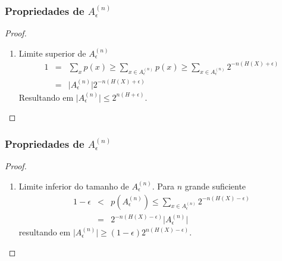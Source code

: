 \begin{frame}%
  \frametitle{Propriedades de $A_\epsilon^{(n)}$}
  \begin{proof}
  \begin{enumerate}[3]
  \item Limite superior de $A_\epsilon^{(n)}$
        \begin{eqnarray}
        1 &=& \sum_x p(x) \geq \sum_{x \in A_\epsilon^{(n)}} p(x) \geq \sum_{x \in A_\epsilon^{(n)}} 2^{-n(H(X)+\epsilon)} \nonumber \\
        &=& \vert A_\epsilon^{(n)} \vert 2^{-n(H(X)+\epsilon)}
        \end{eqnarray}
        Resultando em $\vert A_\epsilon^{(n)} \vert \leq 2^{n(H+\epsilon)}$.
  \end{enumerate}
  \end{proof}
\end{frame}


\begin{frame}%
  \frametitle{Propriedades de $A_\epsilon^{(n)}$}
  \begin{proof}
  \begin{enumerate}[4]
  \item Limite inferior do tamanho de $A_\epsilon^{(n)}$. Para $n$ grande suficiente
        \begin{eqnarray}
        1 - \epsilon &<& p(A_\epsilon^{(n)}) \leq \sum_{x \in A_\epsilon^{(n)}} 2^{-n(H(X)-\epsilon)} \nonumber \\
                &=& 2^{-n(H(X)-\epsilon)} \vert A_\epsilon^{(n)} \vert
        \end{eqnarray}
        resultando em $\vert A_\epsilon^{(n)} \vert \geq (1-\epsilon) 2^{n(H(X)-\epsilon)}$.
  \end{enumerate}
  \end{proof}
\end{frame}


